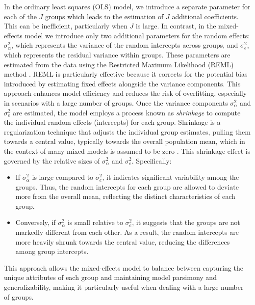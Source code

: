 In the ordinary least squares (OLS) model, we introduce a separate parameter for each of the $J$ groups which leads to the estimation of $J$ additional coefficients. This can be inefficient, particularly when $J$ is large. In contrast, in the mixed-effects model we introduce only two additional parameters for the random effects: $\sigma^2_{\alpha}$, which represents the variance of the random intercepts across groups, and $\sigma^2_e$, which represents the residual variance within groups. These parameters are estimated from the data using the Restricted Maximum Likelihood (REML) method \cite{bates}. REML is particularly effective because it corrects for the potential bias introduced by estimating fixed effects alongside the variance components. This approach enhances model efficiency and reduces the risk of overfitting, especially in scenarios with a large number of groups. Once the variance components $\sigma^2_{\alpha}$ and $\sigma^2_e$ are estimated, the model employs a process known as \textit{shrinkage} to compute the individual random effects (intercepts) for each group. Shrinkage is a regularization technique that adjusts the individual group estimates, pulling them towards a central value, typically towards the overall population mean, which in the context of many mixed models is assumed to be zero \cite{bates}. This shrinkage effect is governed by the relative sizes of $\sigma^2_{\alpha}$ and $\sigma^2_e$. Specifically:
\begin{itemize}
    \item If $\sigma^2_{\alpha}$ is large compared to $\sigma^2_e$, it indicates significant variability among the groups. Thus, the random intercepts for each group are allowed to deviate more from the overall mean, reflecting the distinct characteristics of each group.
    \item Conversely, if $\sigma^2_{\alpha}$ is small relative to $\sigma^2_e$, it suggests that the groups are not markedly different from each other. As a result, the random intercepts are more heavily shrunk towards the central value, reducing the differences among group intercepts.
\end{itemize}
This approach allows the mixed-effects model to balance between capturing the unique attributes of each group and maintaining model parsimony and generalizability, making it particularly useful when dealing with a large number of groups.

